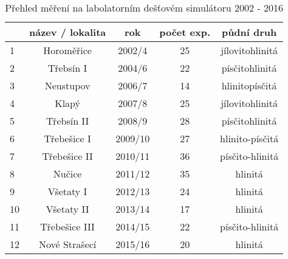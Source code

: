 \begin{table}[htbp]
  \centering
  \caption{Přehled měření na labolatorním dešťovém simulátoru 2002 - 2016}
    \begin{tabular}{lcccc}
    \hline  \hline 
          &název / lokalita& rok & počet exp. & půdní druh \\
          \hline 
%          
    1     & Horoměřice & 2002/4 & 25    & jílovitohlinitá \\
    2     & Třebsín I & 2004/6 & 22    & písčitohlinitá \\
    3     & Neustupov & 2006/7 & 14    & hlinitopísčitá \\
    4     & Klapý & 2007/8 & 25    & jílovitohlinitá \\
    5     & Třebsín II & 2008/9 & 28    & písčitohlinitá \\
    6     & Třebešice I & 2009/10 & 27    & hlinito-písčitá \\
    7     & Třebešice II & 2010/11 & 36    & písčito-hlinitá \\
    8     & Nučice & 2011/12 & 35    & hlinitá \\
    9     & Všetaty I & 2012/13 & 24    & hlinitá \\
    10    & Všetaty II & 2013/14 & 17    & hlinitá \\
    11    & Třebešice III & 2014/15 & 22    & písčito-hlinitá \\
    12    & Nové Strašecí & 2015/16 & 20    & hlinitá \\
    \hline  \hline 
    \end{tabular}%
  \label{tab:addlabel}%
\end{table}%
